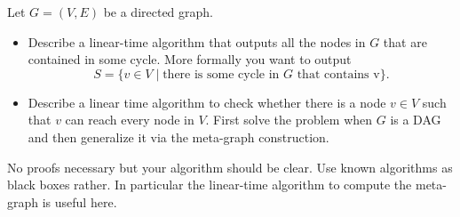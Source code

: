 \documentclass[11pt]{article}
\begin{document}

\item Let $G=(V,E)$ be a directed graph.
  \begin{itemize}
  \item Describe a linear-time algorithm that outputs all the nodes in
    $G$ that are contained in some cycle. More formally you want to
    output
    $$S = \{ v \in V \mid \text{there is some cycle in $G$ that
      contains v}\}.$$
  \item Describe a linear time algorithm to check whether there is a
    node $v \in V$ such that $v$ can reach every node in $V$. First
    solve the problem when $G$ is a DAG and then generalize it via the
    meta-graph construction.
  \end{itemize}
  No proofs necessary but your algorithm should be clear. Use known
  algorithms as black boxes rather. In particular the linear-time algorithm to
  compute the meta-graph is useful here.
\end{document}
